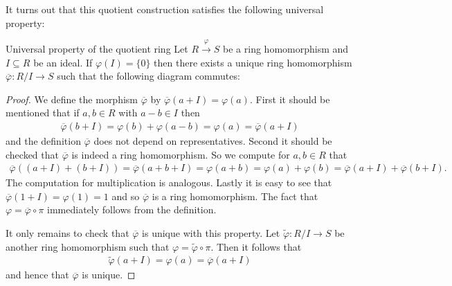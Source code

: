 \documentclass[../notes.tex]{subfiles}
\begin{document}
\smallskip
\noindent
It turns out that this quotient construction satisfies the following universal property:

\smallskip
\begin{lemm}{Universal property of the quotient ring}{}
  Let $R \xrightarrow{\varphi} S$ be a ring homomorphism and $I \subseteq R$ be an ideal.
  If $\varphi(I) = \{0\}$ then there exists a unique ring homomorphism
  $\overline{\varphi}: R/I \to S$ such that the following diagram commutes:
  \begin{center}
  \end{center}
\end{lemm}

\begin{proof}
  We define the morphism $\overline{\varphi}$ by $\overline{\varphi}(a + I) = \varphi(a)$.
  First it should be mentioned that if $a,b \in R$ with $a - b \in I$ then
  \begin{align*}
    \overline{\varphi}(b + I) = \varphi(b) + \varphi(a - b) = \varphi(a) =
    \overline{\varphi}(a + I)
  \end{align*}
  and the definition $\overline{\varphi}$ does not depend on representatives. Second it should
  be checked that $\overline{\varphi}$ is indeed a ring homomorphism. So we compute
  for $a,b \in R$ that
  \begin{align*}
    \overline{\varphi}((a + I) + (b + I)) = \overline{\varphi}(a + b + I) = \varphi(a + b)
    = \varphi(a) + \varphi(b) = \overline{\varphi}(a + I) + \overline{\varphi}(b + I).
  \end{align*}
  The computation for multiplication is analogous. Lastly it is easy to see that
  $\overline{\varphi}(1 + I) = \varphi(1) = 1$ and so $\overline{\varphi}$ is a ring
  homomorphism.
  The fact that $\varphi = \overline{\varphi} \circ \pi$ immediately follows from the
  definition.

  \smallskip
  \noindent
  It only remains to check that $\overline{\varphi}$ is unique with this property.
  Let $\tilde{\varphi}: R/I \to S$ be another ring homomorphism such that
  $\varphi = \tilde{\varphi} \circ \pi$. Then it follows that
  \begin{align*}
    \tilde{\varphi}(a + I) = \varphi(a) = \overline{\varphi}(a + I)
  \end{align*}
  and hence that $\overline{\varphi}$ is unique.
  
\end{proof}
\end{document}
